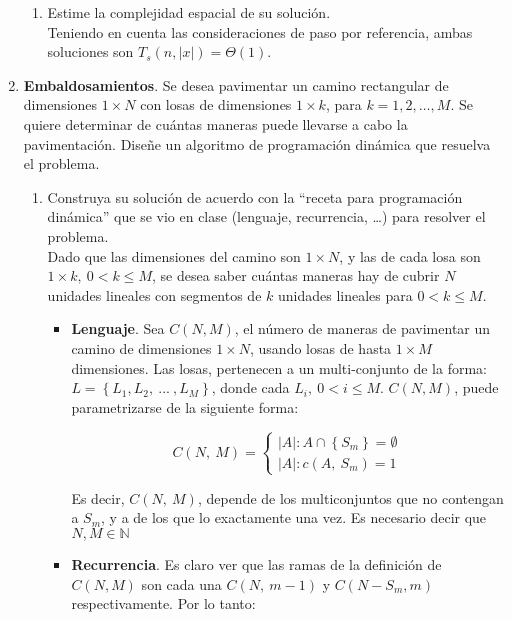 \documentclass[11pt,spanish]{article}
\begin{document}
\begin{enumerate}
\begin{enumerate}
		\item Estime la complejidad espacial de su solución. \\
		
		Teniendo en cuenta las consideraciones de paso por referencia, ambas soluciones son $T_{s}(n, \left| x \right|) = \Theta(1)$. 
		
	\end{enumerate}
	
	\item \textbf{Embaldosamientos}. Se desea pavimentar un camino rectangular de dimensiones $1 \times N$ con losas de dimensiones $1 \times k$,
para $k = 1,2,…,M$. Se quiere determinar de cuántas maneras puede llevarse a cabo la pavimentación. Diseñe un algoritmo de programación dinámica que resuelva el problema.
	\begin{enumerate}
		\item Construya su solución de acuerdo con la “receta para programación dinámica” que se vio en
clase (lenguaje, recurrencia, …) para resolver el problema. \\

Dado que las dimensiones del camino son $1 \times N$, y las de cada losa son $1 \times k,\ 0 < k \leq M$, se desea saber cuántas maneras hay de cubrir $N$ unidades lineales con segmentos de $k$ unidades lineales para $0 < k \leq M$. \\

	\begin{itemize}
		\item \textbf{Lenguaje}. Sea $C(N, M)$, el número de maneras de pavimentar un camino de dimensiones $1 \times N$, usando losas de hasta $1 \times M$ dimensiones. Las losas, pertenecen a un multi-conjunto de la forma: $L = \left\{ L_{1}, L_{2},\ ...\ , L_{M} \right\}$, donde cada $L_{i},\ 0 < i \leq M$. $C(N, M)$, puede parametrizarse de la siguiente forma:
		
		$$C(N,\ M) = 
			\begin{cases} 
				\left| A \right| : A \cap \left\{ S_{m} \right\} = \emptyset \\ 
				\left| A \right| : c(A,\ S_{m}) = 1	 
			\end{cases}$$
			
		Es decir, $C(N,\ M)$, depende de los multiconjuntos que no contengan a $S_{m}$, y a de los que lo exactamente una vez. Es necesario decir que $N, M \in \mathbb{N}$
		
		\item \textbf{Recurrencia}. Es claro ver que las ramas de la definición de $C(N, M)$ son cada una $C(N,\ m - 1)$ y $C(N- S_{m}, m)$ respectivamente. Por lo tanto:
		

\end{itemize}
\end{enumerate}
\end{enumerate}
\end{document}
